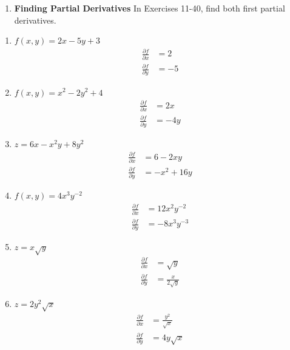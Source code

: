 \begin{enumerate}[label={}, leftmargin=*]
    \item \textbf{Finding Partial Derivatives} In Exercises 11-40, find both first partial derivatives.
\end{enumerate}
\begin{enumerate}
    \item $f(x, y)=2 x-5 y+3$
          \sol{}
          \begin{align*}
              \frac{\partial f}{\partial x} & = 2 \\ \frac{\partial f}{\partial y} &= -5
          \end{align*}

    \item $f(x, y)=x^2-2 y^2+4$
          \sol{}
          \begin{align*}
              \frac{\partial f}{\partial x} & = 2x \\ \frac{\partial f}{\partial y} &= -4y
          \end{align*}

    \item $z=6 x-x^2 y+8 y^2$
          \sol{}
          \begin{align*}
              \frac{\partial f}{\partial x} & = 6-2xy \\ \frac{\partial f}{\partial y} &= -x^2+16y
          \end{align*}

    \item $f(x, y)=4 x^3 y^{-2}$
          \sol{}
          \begin{align*}
              \frac{\partial f}{\partial x} & = 12x^2y^{-2} \\ \frac{\partial f}{\partial y} &= -8x^3y^{-3}
          \end{align*}

    \item $z=x \sqrt{y}$
          \sol{}
          \begin{align*}
              \frac{\partial f}{\partial x} & = \sqrt{y} \\ \frac{\partial f}{\partial y} &= \frac{x}{2\sqrt{y}}
          \end{align*}
          \newpage
    \item $z=2 y^2 \sqrt{x}$
          \sol{}
          \begin{align*}
              \frac{\partial f}{\partial x} & = \frac{y^2}{\sqrt{x}} \\ \frac{\partial f}{\partial y} &= 4y\sqrt{x}
          \end{align*}


\end{enumerate}
